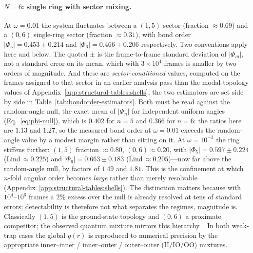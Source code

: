 \paragraph{$N{=}6$: single ring with sector mixing.}
At $\omega=0.01$ the system fluctuates between a $(1,5)$ sector (fraction
$\approx 0.69$) and a $(0,6)$ single-ring sector (fraction $\approx 0.31$),
with bond order $|\Phi_5|=0.453\pm0.214$ and $|\Phi_6|=0.466\pm0.206$
respectively. Two conventions apply here and below. The quoted $\pm$ is the frame-to-frame
standard deviation of $|\Phi_m|$, not a standard error on its mean, which with $3\times10^4$
frames is smaller by two orders of magnitude. And these are \emph{sector-conditioned} values,
computed on the frames assigned to that sector in an earlier analysis pass than the
modal-topology values of Appendix~\ref{app:structural-tables:shells}; the two estimators are
set side by side in Table~\ref{tab:bondorder-estimators}. Both must be read against the random-angle
null, the exact mean of $|\Phi_n|$ for independent uniform angles
(Eq.~\eqref{eq:phi-null}), which is $0.402$ for $n{=}5$ and $0.366$ for $n{=}6$: the ratios
here are $1.13$ and $1.27$, so the measured bond order at $\omega=0.01$
exceeds the random-angle value by a modest margin rather than sitting on it.
At $\omega=10^{-3}$ the ring stiffens further:
$(1,5)$ fraction $\approx 0.80$, $(0,6)\approx 0.20$, with
$|\Phi_5|=0.597\pm0.224$ (Lind$\,\approx\!0.225$) and
$|\Phi_6|=0.663\pm0.183$ (Lind$\,\approx\!0.205$)---now far above the random-angle null,
by factors of $1.49$ and $1.81$. This is the confinement at which $n$-fold angular order
becomes \emph{large} rather than merely resolvable
(Appendix~\ref{app:structural-tables:shells}). The distinction matters because with
$10^4$--$10^6$ frames a $2\%$ excess over the null is already resolved at tens of standard
errors; detectability is therefore not what separates the regimes, magnitude is.
Classically $(1,5)$ is the ground-state topology and $(0,6)$ a proximate
competitor; the observed quantum mixture mirrors this
hierarchy~\cite{schweigert1994spectralpropertieschargedparticles,Kong_2002}.
In both weak-trap cases the global $g(r)$ is reproduced to numerical
precision by the appropriate inner--inner / inner--outer / outer--outer (II/IO/OO) mixtures.

